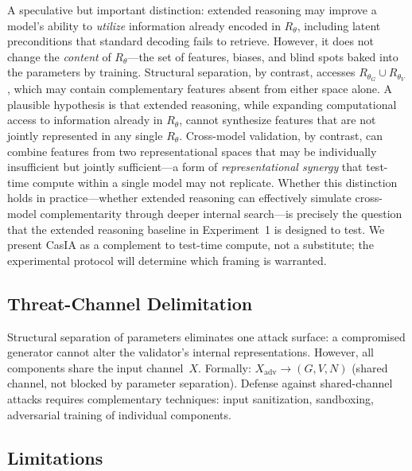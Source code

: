 \documentclass[11pt,a4paper]{article}
\theoremstyle{definition}
\newcommand{\Rtheta}{R_\theta}
\newcommand{\thetaG}{\theta_G}
\newcommand{\thetaV}{\theta_V}
\begin{document}
A speculative but important distinction: extended reasoning may improve a model's ability to \emph{utilize} information already encoded in $\Rtheta$, including latent preconditions that standard decoding fails to retrieve. However, it does not change the \emph{content} of $\Rtheta$---the set of features, biases, and blind spots baked into the parameters by training. Structural separation, by contrast, accesses $R_{\thetaG} \cup R_{\thetaV}$, which may contain complementary features absent from either space alone. A plausible hypothesis is that extended reasoning, while expanding computational access to information already in $\Rtheta$, cannot synthesize features that are not jointly represented in any single $\Rtheta$. Cross-model validation, by contrast, can combine features from two representational spaces that may be individually insufficient but jointly sufficient---a form of \emph{representational synergy} that test-time compute within a single model may not replicate. Whether this distinction holds in practice---whether extended reasoning can effectively simulate cross-model complementarity through deeper internal search---is precisely the question that the extended reasoning baseline in Experiment~1 is designed to test. We present CasIA as a complement to test-time compute, not a substitute; the experimental protocol will determine which framing is warranted.

\subsection{Threat-Channel Delimitation}

Structural separation of parameters eliminates one attack surface: a compromised generator cannot alter the validator's internal representations. However, all components share the input channel~$X$. Formally: $X_\text{adv} \to (G, V, N)$ (shared channel, not blocked by parameter separation). Defense against shared-channel attacks requires complementary techniques: input sanitization, sandboxing, adversarial training of individual components.

\subsection{Limitations}
\end{document}
